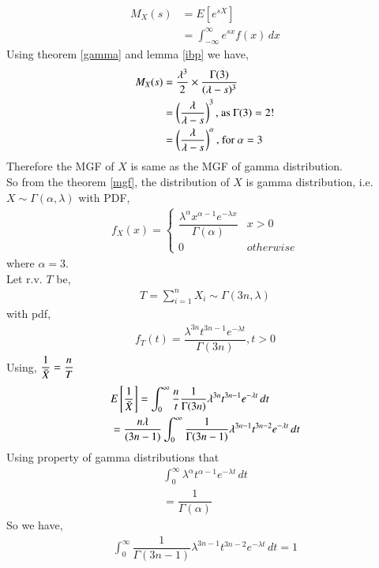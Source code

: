 \documentclass[journal,12pt,twocolumn]{IEEEtran}
\theoremstyle{definition}
\begin{document}
\begin{enumerate}
\begin{align}
    M_X(s) &= E[e^{sX}] \\
    &=  \int_{-\infty}^{\infty} e^{sx} f(x)\,dx 
    \end{align}
Using theorem \ref{gamma} and lemma \ref{ibp} we have,
\begin{align}
    M_X(s) & = \dfrac{\lambda^3}{2} \times \dfrac{\Gamma(3)}{(\lambda- s)^3} \\
    &= \left(\dfrac{\lambda}{\lambda-s}\right)^3  \text{, as $\Gamma(3) = 2!$} \\
    &= \left(\dfrac{\lambda}{\lambda-s}\right)^\alpha  \text{, for $\alpha= 3$} 
\end{align}
Therefore the MGF of $ X $ is same as the MGF of gamma distribution. \\
So from the theorem \ref{mgf}, the distribution of $ X$ is gamma distribution, i.e. $ X \sim \Gamma(\alpha,\lambda)$ with PDF,
\begin{align}
f_{X}(x)  = 
\begin{cases}
\dfrac{\lambda^{\alpha}x^{\alpha-1}e^{-\lambda x}}{\Gamma(\alpha)} &  x > 0
\\
0 & otherwise
\end{cases}
\end{align}
where $ \alpha = 3 $. \\
Let r.v. $T $ be,
\begin{align}
    T = \sum_{i=1}^{n} X_i \sim \Gamma(3n, \lambda)
\end{align}
with pdf,
\begin{align}
    f_T(t)= \dfrac{\lambda^{3n} t^{3n-1}e^{-\lambda t}}{\Gamma(3n)} , t>0
\end{align}
Using, $ \dfrac{1}{\Bar{X}} = \dfrac{n}{T}$
\begin{align}
   & E \left[   \dfrac{1}{\Bar{X}}  \right] =  \int_{0}^{\infty} \dfrac{n}{t} \dfrac{1}{\Gamma(3n)} \lambda^{3n}t^{3n-1}e^{-\lambda t}\,dt \\
    &= \dfrac{n\lambda}{(3n-1)} \int_{0}^{\infty}  \dfrac{1}{\Gamma(3n-1)} \lambda^{3n-1}t^{3n-2}e^{-\lambda t}\,dt 
    \label{expect}
\end{align}
Using property of gamma distributions that
\begin{align}
    \int_{0}^{\infty}  \lambda^{\alpha}t^{\alpha-1}e^{-\lambda t}\,dt \\ 
    = \dfrac{1}{\Gamma(\alpha)}
\end{align}
So we have,
\begin{align}
    \int_{0}^{\infty}  \dfrac{1}{\Gamma(3n-1)} \lambda^{3n-1}t^{3n-2}e^{-\lambda t}\,dt = 1

\end{align}
\end{enumerate}
\end{document}
